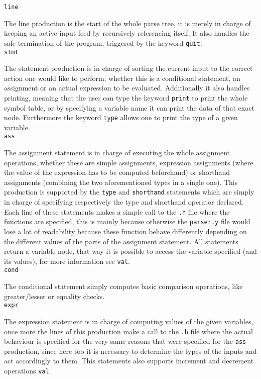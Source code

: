 \documentclass{article}
\begin{document}
\verb|line|

The line production is the start of the whole parse tree, it is merely in charge of keeping an active input feed by recursively referencing itself. It also handles the safe termination of the program, triggered by the keyword \verb|quit|.\\

\verb|stmt|

The statement production is in charge of sorting the current input to the correct action one would like to perform, whether this is a conditional statement, an assignment or an actual expression to be evaluated. Additionally it also handles printing, meaning that the user can type the keyword \verb|print| to print the whole symbol table, or by specifying a variable name it can print the data of that exact node. Furthermore the keyword \verb|type| allows one to print the type of a given variable.\\

\verb|ass|

The assignment statement is in charge of executing the whole assignment operations, whether these are simple assignments, expression assignments (where the value of the expression has to be computed beforehand) or shorthand assignments (combining the two aforementioned types in a single one). This production is supported by the \verb|type| and \verb|shorthand| statements which are simply in charge of specifying respectively the type and shorthand operator declared. Each line of these statements makes a simple call to the \verb|.h| file where the functions are specified, this is mainly because otherwise the \verb|parser.y| file would lose a lot of readability because these function behave differently depending on the different values of the parts of the assignment statement. All statements return a variable node, that way it is possible to access the variable specified (and its values), for more information see \verb|val|.\\

\verb|cond|

The conditional statement simply computes basic comparison operations, like greater/lesser or equality checks.\\

\verb|expr|

The expression statement is in charge of computing values of the given variables, once more the lines of this production make a call to the \verb|.h| file where the actual behaviour is specified for the very same reasons that were specified for the \verb|ass| production, since here too it is necessary to determine the types of the inputs and act accordingly to them. This statements also supports increment and decrement operations\newpage
\verb|val|\\
\end{document}
